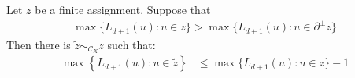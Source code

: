 \begin{claim}
  \label{claim:reduce_stab}
  Let $z$ be a finite assignment. Suppose that 
  \begin{equation*}
    \begin{split}
            \max \big\{ L_{d+1}(u) :  u \in z \big\} > \max \big\{ L_{d+1}(u) : u \in \partial^{\pm} z \big\}
    \end{split}
  \end{equation*}
  Then there is $\tilde{z} \sim_{\mathcal{C}_{X}} z$ such that:
\begin{equation*}
  \begin{split}
    \max \left\{ L_{d+1}(u) : u \in \tilde{z} \right\} & \le  \max \big\{ L_{d+1}(u) : u \in z \big\} - 1
  \end{split}
\end{equation*}
\end{claim}
